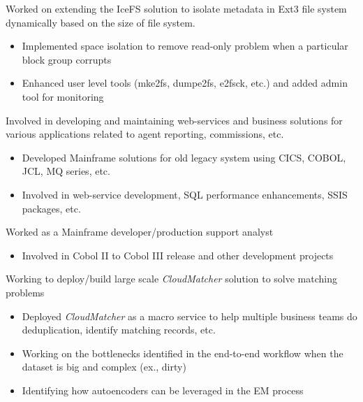 \documentclass{resume}
\begin{document}
Worked on extending the IceFS solution to isolate metadata in Ext3 file system dynamically based on the size of file system.
\begin{itemize}
  \item Implemented space isolation to remove read-only problem when a particular block group corrupts
  \item Enhanced user level tools (mke2fs, dumpe2fs, e2fsck, etc.) and added admin tool for monitoring
\end{itemize}

Involved in developing and maintaining web-services and business solutions for various applications related to agent reporting, commissions, etc.
\begin{itemize}
  \item Developed Mainframe solutions for old legacy system using CICS, COBOL, JCL, MQ series, etc.
  \item Involved in web-service development, SQL performance enhancements, SSIS packages, etc.
\end{itemize}

Worked as a Mainframe developer/production support analyst
\begin{itemize}
  \item Involved in Cobol II to Cobol III release and other development projects
\end{itemize}

Working to deploy/build large scale \textit{CloudMatcher} solution to solve matching problems
\begin{itemize}
  \item Deployed \textit{CloudMatcher} as a macro service to help multiple business teams do deduplication, identify matching records, etc.
  \item Working on the bottlenecks identified in the end-to-end workflow when the dataset is big and complex (ex., dirty)
  \item Identifying how autoencoders can be leveraged in the EM process
\end{itemize}
\end{document}
